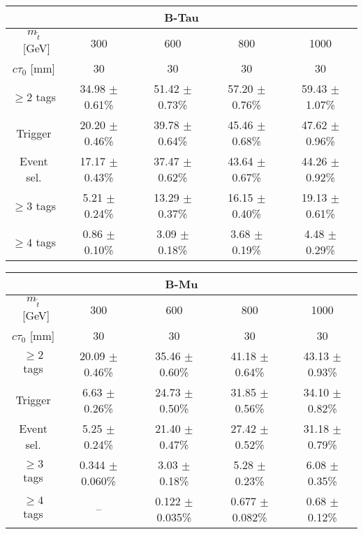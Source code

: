 \begin{table}[tb]
\begin{center}
\begin{tabular}{ccccc} 
\multicolumn{5}{c}{\textbf{B-Tau}} \\
 \hline 
 $m_{\tilde{t}}$~[GeV] & 300 & 600 & 800 & 1000 \\ 
$c\tau_0$ [mm] & 30 & 30 & 30 & 30 \\ 
 \hline 
$\geq 2$ tags & 34.98 $\pm$ 0.61\% & 51.42 $\pm$ 0.73\% & 57.20 $\pm$ 0.76\% & 59.43 $\pm$ 1.07\% \\ 
 Trigger & 20.20 $\pm$ 0.46\% & 39.78 $\pm$ 0.64\% & 45.46 $\pm$ 0.68\% & 47.62 $\pm$ 0.96\% \\ 
 Event sel.& 17.17 $\pm$ 0.43\% & 37.47 $\pm$ 0.62\% & 43.64 $\pm$ 0.67\% & 44.26 $\pm$ 0.92\% \\ 
 $\geq 3$ tags & 5.21 $\pm$ 0.24\% & 13.29 $\pm$ 0.37\% & 16.15 $\pm$ 0.40\% & 19.13 $\pm$ 0.61\% \\ 
 $\geq 4$ tags& 0.86 $\pm$ 0.10\% & 3.09 $\pm$ 0.18\% & 3.68 $\pm$ 0.19\% & 4.48 $\pm$ 0.29\% \\ 
\end{tabular}

\begin{tabular}{ccccc} 
\multicolumn{5}{c}{\textbf{B-Mu}} \\
 \hline 
 $m_{\tilde{t}}$~[GeV] & 300 & 600 & 800 & 1000 \\ 
 $c\tau_0$ [mm] & 30 & 30 & 30 & 30 \\ 
\hline 
$\geq 2$ tags &  20.09 $\pm$ 0.46\% &    35.46 $\pm$ 0.60\% &    41.18 $\pm$ 0.64\% &    43.13 $\pm$ 0.93\%     \\ 
Trigger &     6.63 $\pm$ 0.26\% &   24.73 $\pm$ 0.50\% &    31.85 $\pm$ 0.56\% &    34.10 $\pm$ 0.82\% \\ 
Event sel. &  5.25 $\pm$ 0.24\% &    21.40 $\pm$ 0.47\% &    27.42 $\pm$ 0.52\% &    31.18 $\pm$ 0.79\% \\ 
$\geq 3$ tags &    0.344 $\pm$ 0.060\% &  3.03 $\pm$ 0.18\% &     5.28 $\pm$ 0.23\% &     6.08 $\pm$ 0.35\% \\ 
$\geq 4$ tags &    -- &  0.122 $\pm$ 0.035\% &       0.677 $\pm$ 0.082\% &   0.68 $\pm$ 0.12\% \\ 
\end{tabular}
\end{center}
\end{table}
